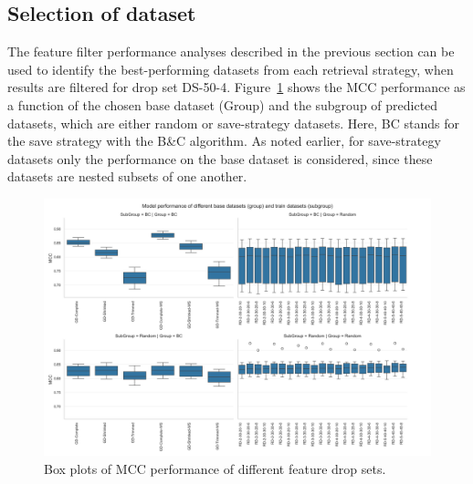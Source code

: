 \subsection{Selection of dataset}
\label{sec:dataset_selection}

The feature filter performance analyses described in the previous section can be used to identify the best-performing datasets
from each retrieval strategy, when results are filtered for drop set DS-50-4. Figure~\ref{fig:dataset_performance_group_subgroup}
shows the MCC performance as a function of the chosen base dataset (Group) and the subgroup of predicted datasets, which are either
random or save-strategy datasets. Here, BC stands for the save strategy with the B\&C algorithm.
As noted earlier, for save-strategy datasets only the performance on the base dataset is considered,
since these datasets are nested subsets of one another.
\begin{figure}[ht]
    \centering
    \includegraphics[width =\textwidth]{pictures/feature_filter/group_subgroup_results.png}
    \caption{Box plots of MCC performance of different feature drop sets.}
    \label{fig:dataset_performance_group_subgroup}
\end{figure}

